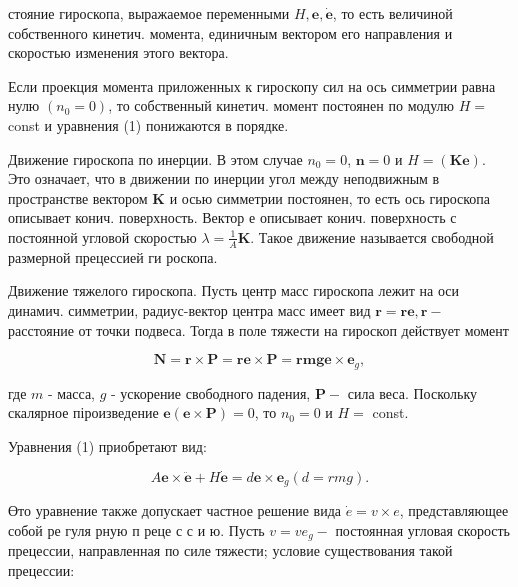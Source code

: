 \documentclass[10pt]{article}
\begin{document}
стояние гироскопа, выражаемое переменными $H, \boldsymbol{e}, \dot{\boldsymbol{e}}$, то есть величиной собственного кинетич. момента, единичным вектором его направления и скоростью изменения этого вектора.



Если проекция момента приложенных к гироскопу сил на ось симметрии равна нулю $\left(n_{0}=0\right)$, то собственный кинетич. момент постоянен по модулю $H=$ const и уравнения (1) понижаются в порядке.



Движение гироскопа по инерции. В этом случае $n_{0}=0$, $\boldsymbol{n}=0$ и $H=(\boldsymbol{K e})$. Это означает, что в движении по инерции угол между неподвижным в пространстве вектором $\boldsymbol{K}$ и осью симметрии постоянен, то есть ось гироскопа описывает конич. поверхность. Вектор $е$ описывает конич. поверхность с постоянной угловой скоростью $\lambda=\frac{1}{A} \boldsymbol{K}$. Такое движение называется свободной размерной прецессией ги роскопа.



Движение тяжелого гироскопа. Пусть центр масс гироскопа лежит на оси динамич. симметрии, радиус-вектор центра масс имеет вид $\boldsymbol{r}=\boldsymbol{r e}, \boldsymbol{r}-$ расстояние от точки подвеса. Тогда в поле тяжести на гироскоп действует момент



\[

\boldsymbol{N}=\boldsymbol{r} \times \boldsymbol{P}=\boldsymbol{r} \boldsymbol{e} \times \boldsymbol{P}=\boldsymbol{r m g} \boldsymbol{e} \times \boldsymbol{e}_{g},

\]



где $m$ - масса, $g$ - ускорение свободного падения, $\boldsymbol{P}-$ сила веса. Поскольку скалярное піроизведение $\boldsymbol{e}(\boldsymbol{e} \times \boldsymbol{P})=0$, то $n_{0}=0$ и $H=$ const.



Уравнения (1) приобретают вид:



\[

A \boldsymbol{e} \times \ddot{\boldsymbol{e}}+H \dot{\boldsymbol{e}}=d \boldsymbol{e} \times \boldsymbol{e}_{g}(d=r m g) .

\]



Өто уравнение также допускает частное решение вида $\dot{e}=v \times e$, представляющее собой ре гуля рную п реце с с и ю. Пусть $v=v e_{g}-$ постоянная угловая скорость прецессии, направленная по силе тяжести; условие существования такой прецессии:
\end{document}
